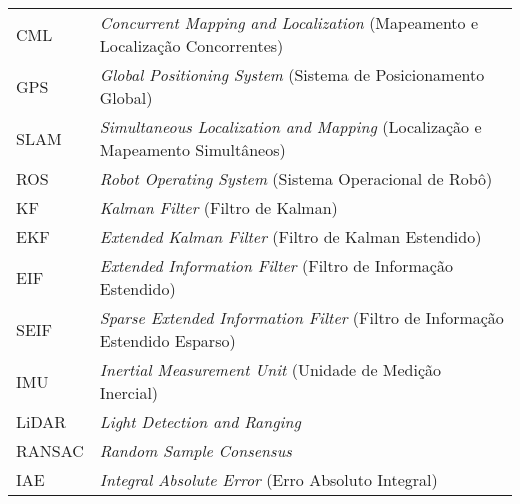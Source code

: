 \begin{longtable}{ll}
CML & \textit{Concurrent Mapping and Localization} (Mapeamento e Localização Concorrentes)\\
GPS & \textit{Global Positioning System} (Sistema de Posicionamento Global)\\
SLAM & \textit{Simultaneous Localization and Mapping} (Localização e Mapeamento Simultâneos) \\
ROS & \textit{Robot Operating System} (Sistema Operacional de Robô)\\
KF & \textit{Kalman Filter} (Filtro de Kalman)\\
EKF & \textit{Extended Kalman Filter} (Filtro de Kalman Estendido)\\
EIF & \textit{Extended Information Filter} (Filtro de Informação Estendido)\\
SEIF & \textit{Sparse Extended Information Filter} (Filtro de Informação Estendido Esparso)\\
IMU & \textit{Inertial Measurement Unit} (Unidade de Medição Inercial)\\
LiDAR & \textit{Light Detection and Ranging} \\
RANSAC & \textit{Random Sample Consensus} \\
IAE & \textit{Integral Absolute Error} (Erro Absoluto Integral)
\end{longtable}

